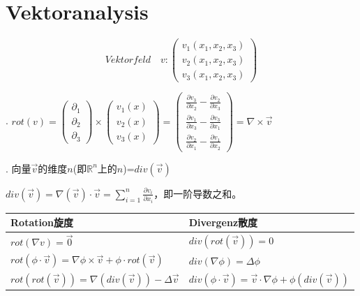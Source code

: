 \documentclass[fleqn]{article}
\begin{document}

\pagestyle{main}

\section{Vektoranalysis}

$$Vektorfeld\quad v:\begin{pmatrix}
    v_1(x_1,x_2,x_3)\\v_2(x_1,x_2,x_3)\\v_3(x_1,x_2,x_3)
\end{pmatrix}$$

. $rot(v)=\begin{pmatrix}
    \partial_1\\\partial_2\\\partial_3
\end{pmatrix}\times\begin{pmatrix}
    v_1(x)\\v_2(x)\\v_3(x)
\end{pmatrix}=\begin{pmatrix}
    \frac{\partial v_3}{\partial x_2}-\frac{\partial v_2}{\partial x_3}\\
    \frac{\partial v_1}{\partial x_3}-\frac{\partial v_3}{\partial x_1}\\
    \frac{\partial v_2}{\partial x_1}-\frac{\partial v_1}{\partial x_2}
\end{pmatrix}=\nabla\times\vec{v}$

. 向量$\vec{v}$的维度$n$(即$\mathbb{R}^n$上的$n$)=$div(\vec{v})$

$div(\vec{v})=\nabla(\vec{v})\cdot \vec{v}=\sum_{i=1}^n\frac{\partial v_i}{\partial x_i}$，即一阶导数之和。

\begin{center}
    \begin{tabular}{l||l}
        \hline
        Rotation旋度&Divergenz散度\\
        \hline
        $rot(\nabla v)=\vec{0}$&$div(rot(\vec{v}))=0$\\
        \hline
        $rot(\phi\cdot\vec{v})=\nabla\phi\times\vec{v}+\phi\cdot rot(\vec{v})$&$div(\nabla\phi)=\Delta\phi$\\
        \hline
        $rot(rot(\vec{v}))=\nabla(div(\vec{v}))-\Delta\vec{v}$&$div(\phi\cdot\vec{v})=\vec{v}\cdot\nabla\phi+\phi(div(\vec{v}))$\\
        \hline
    \end{tabular}
\end{center}
\end{document}
